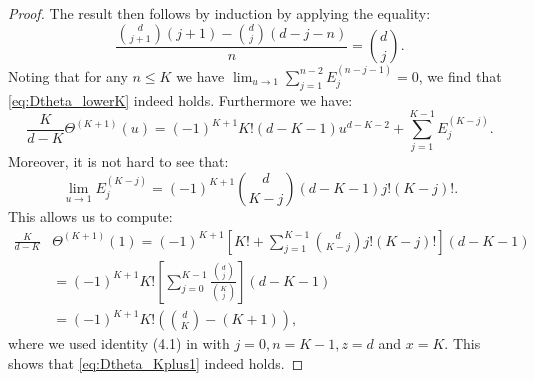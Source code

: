 \documentclass[12pt]{report}
\begin{document}
\begin{proof}
The result then follows by induction by applying the equality:
$$
\frac{\binom{d}{j+1}(j+1) - \binom{d}{j} (d-j-n)}{n} = \binom{d}{j}.
$$
Noting that for any $n \leq K$ we have $\lim_{u\rightarrow 1} \sum_{j=1}^{n-2}  E_j^{(n-j-1)} = 0$, we find that \eqref{eq:Dtheta_lowerK} indeed holds. Furthermore we have:
$$
\frac{K}{d-K} \Theta^{(K+1)}(u)= (-1)^{K+1} K! (d-K-1) u^{d-K-2} + \sum_{j=1}^{K-1} E_j^{(K-j)}.
$$
Moreover, it is not hard to see that:
$$
\lim_{u \rightarrow 1} E_j^{(K-j)} = (-1)^{K+1} \binom{d}{K-j} (d-K-1) j! (K-j)!.
$$
This allows us to compute:
\begin{align*}
\frac{K}{d-K}& \Theta^{(K+1)} (1) = (-1)^{K+1} \left[ K! + \sum_{j=1}^{K-1} \binom{d}{K-j} j! (K-j)! \right] (d-K-1)\\
&= (-1)^{K+1}K! \left[ \sum_{j=0}^{K-1} \frac{\binom{d}{j}}{\binom{K}{j}} \right]  (d-K-1)\\
&= (-1)^{K+1}K! \left(\binom{d}{K}-(K+1)\right),
\end{align*}
where we used identity (4.1) in \cite[p46]{gould1972combinatorial} with $j=0, n=K-1, z=d$ and $x=K$. This shows that \eqref{eq:Dtheta_Kplus1} indeed holds.


\end{proof}
\end{document}
